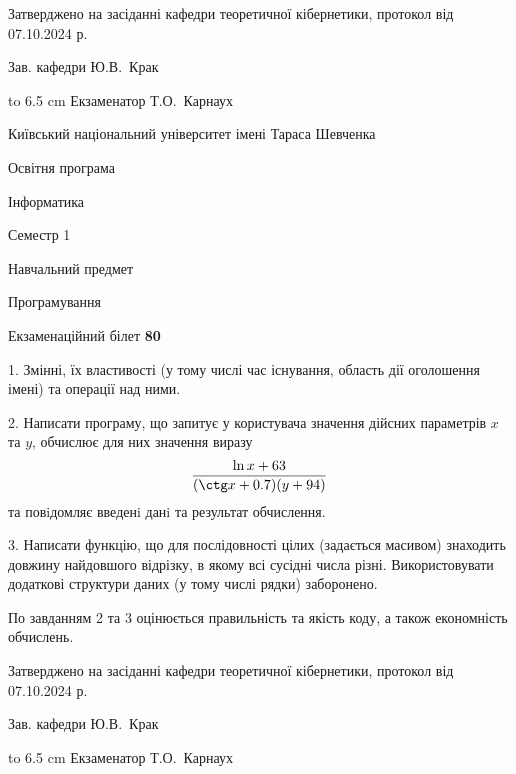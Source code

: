 \documentclass[12pt, ukrainian]{article}
\begin{document}
{\smallskip\smallskip \begin {scriptsize} Затверджено на засіданні кафедри теоретичної кібернетики, протокол   від   07.10.2024 р.\par\smallskip\smallskip\smallskip\smallskip
{\parbox {6.5 cm} {Зав. кафедри \dotfill Ю.В.~Крак}}\hspace {0.7cm} {\hbox to 6.5 cm { Екзаменатор \dotfill Т.О.~Карнаух}} \end{scriptsize}}
\vspace{0.9cm}
{{\begin {scriptsize}\par
{ \center  Київський національний університет імені Тараса Шевченка \par}
{\parbox {5 cm}{Освітня програма \hfill}{\parbox {7 cm}{Інформатика\hfill}}\parbox {6 cm}{\hfill Семестр 1}}\par
{\parbox {5 cm} {Навчальний предмет \hfill}\parbox {7 cm}{Програмування \hfill}\parbox {6cm}{\hfill}\par}\vspace{-15pt} \end{scriptsize}}{\center Екзаменаційний білет \No \textbf { 80 }\par}}
{%
1. Змінні, їх властивості (у тому числі час існування, область дії оголошення імені) та операції над ними.%
\par
2. Написати програму, що запитує у користувача значення дійсних параметрів $x$ та $y$, обчислює для них значення виразу 
$$\frac{\ln x + 63}{(\ctg x + 0.7) (y + 94)}$$ 
та повiдомляє введенi данi та результат обчислення.

\par
3. Написати функцію, що для послідовності цілих (задається масивом) знаходить довжину найдовшого відрізку, в якому всі сусідні числа різні. Використовувати додаткові структури даних (у тому числі рядки) заборонено.

По завданням 2 та 3 оцінюється правильність та якість коду, а також економність обчислень.

}
{\smallskip\smallskip \begin {scriptsize} Затверджено на засіданні кафедри теоретичної кібернетики, протокол   від   07.10.2024 р.\par\smallskip\smallskip\smallskip\smallskip
{\parbox {6.5 cm} {Зав. кафедри \dotfill Ю.В.~Крак}}\hspace {0.7cm} {\hbox to 6.5 cm { Екзаменатор \dotfill Т.О.~Карнаух}} \end{scriptsize}}
\vspace{0.9cm}
\end{document}
